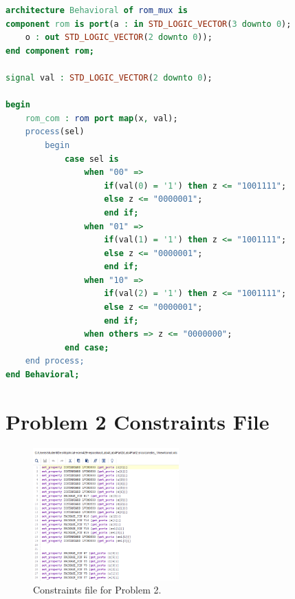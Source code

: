 \documentclass[11pt]{article}
\begin{document}
\begin{appendices}
\begin{lstlisting}[language=VHDL]
architecture Behavioral of rom_mux is
component rom is port(a : in STD_LOGIC_VECTOR(3 downto 0); 
	o : out STD_LOGIC_VECTOR(2 downto 0));
end component rom;

signal val : STD_LOGIC_VECTOR(2 downto 0);

begin
    rom_com : rom port map(x, val);
    process(sel)
        begin
            case sel is
                when "00" => 
                    if(val(0) = '1') then z <= "1001111";
                    else z <= "0000001";
                    end if;
                when "01" =>
                    if(val(1) = '1') then z <= "1001111";
                    else z <= "0000001";
                    end if;
                when "10" => 
                    if(val(2) = '1') then z <= "1001111";
                    else z <= "0000001";
                    end if;
                when others => z <= "0000000";
            end case;
    end process;
end Behavioral;
\end{lstlisting}

\section{Problem 2 Constraints File}
\begin{figure}[H]
\begin{center}
	\includegraphics[width=0.5\textwidth]{../report-images/Part2Const.png}
	\caption{\label{fig:Part2ConstFile}Constraints file for Problem 2.}
\end{center}
\end{figure}

\end{appendices}
\end{document}

